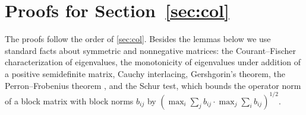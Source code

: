 \section{Proofs for \texorpdfstring{Section~\ref{sec:col}}{collectives}}\label{app:col}

The proofs follow the order of \cref{sec:col}. Besides the lemmas below we use standard facts about symmetric and nonnegative matrices: the Courant--Fischer characterization of eigenvalues, the monotonicity of eigenvalues under addition of a positive semidefinite matrix, Cauchy interlacing, Gershgorin's theorem, the Perron--Frobenius theorem \citep{horn2012matrix}, and the Schur test, which bounds the operator norm of a block matrix with block norms $b_{ij}$ by $(\max_i\sum_jb_{ij}\cdot\max_j\sum_ib_{ij})^{1/2}$.

